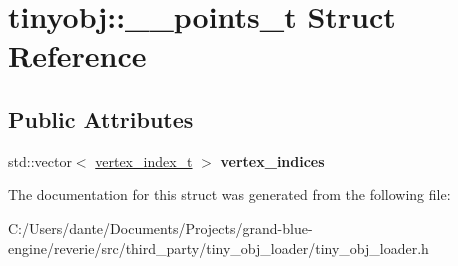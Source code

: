 \hypertarget{structtinyobj_1_1____points__t}{}\section{tinyobj\+::\+\_\+\+\_\+points\+\_\+t Struct Reference}
\label{structtinyobj_1_1____points__t}
\subsection*{Public Attributes}
\begin{DoxyCompactItemize}
\item 
\mbox{\label{structtinyobj_1_1____points__t_a0dd77a68164271a22597f897fac44464}} 
std\+::vector$<$ \mbox{\hyperlink{structtinyobj_1_1vertex__index__t}{vertex\+\_\+index\+\_\+t}} $>$ {\bfseries vertex\+\_\+indices}
\end{DoxyCompactItemize}


The documentation for this struct was generated from the following file\+:\begin{DoxyCompactItemize}
\item 
C\+:/\+Users/dante/\+Documents/\+Projects/grand-\/blue-\/engine/reverie/src/third\+\_\+party/tiny\+\_\+obj\+\_\+loader/tiny\+\_\+obj\+\_\+loader.\+h\end{DoxyCompactItemize}
